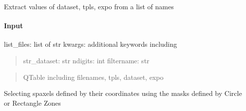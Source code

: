 \documentclass[letterpaper,10pt,english]{sphinxmanual}
\begin{document}

\begin{fulllineitems}
\label{\detokenize{api/pymusepipe:pymusepipe.util_image.scan_filenames_from_list}}
\pysigstartsignatures
{}
\pysigstopsignatures
\sphinxAtStartPar
Extract values of dataset, tpls, expo from a list of names


\paragraph{Input}
\label{\detokenize{api/pymusepipe:id156}}
\sphinxAtStartPar
list\_files: list of str
kwargs: additional keywords including
\begin{quote}

\sphinxAtStartPar
str\_dataset: str
ndigits: int
filtername: str
\end{quote}
\begin{quote}\begin{description}
\sphinxAtStartPar
QTable including filenames, tpls, dataset, expo

\end{description}\end{quote}

\end{fulllineitems}


\begin{fulllineitems}
\label{\detokenize{api/pymusepipe:pymusepipe.util_image.select_spaxels}}
\pysigstartsignatures
{}
\pysigstopsignatures
\sphinxAtStartPar
Selecting spaxels defined by their coordinates
using the masks defined by Circle or Rectangle Zones

\end{fulllineitems}
\end{document}
